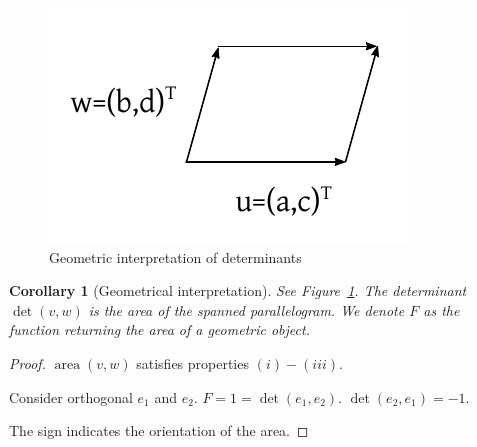 \documentclass{article}
\newcounter{lecref}[section]
\numberwithin{lecref}{section}
\newtheorem{corollary}[lecref]{Corollary}
\begin{document}
\begin{figure}[t]
  \begin{center}
    \includegraphics{img/01_geometric_interpretation_determinant.pdf}
    \caption{Geometric interpretation of determinants}
    \label{img:geo_det}
  \end{center}
\end{figure}

\begin{corollary}[Geometrical interpretation]
  See Figure~\ref{img:geo_det}.
  The determinant $\det(v,w)$ is the area of the spanned parallelogram.
  We denote $F$ as the function returning the area of a geometric object.
\end{corollary}

\begin{proof}
  $\operatorname{area}(v,w)$ satisfies properties $(i)-(iii)$.

  Consider orthogonal $e_1$ and $e_2$.
  $F = 1 = \det(e_1, e_2)$. $\det(e_2, e_1) = -1$.

  The sign indicates the orientation of the area.
\end{proof}
\end{document}
